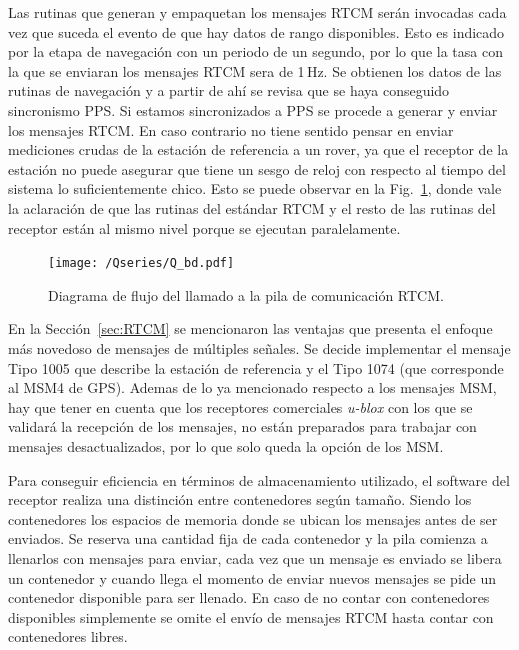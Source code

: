 \documentclass[a4paper,12pt,oneside,onecolumn,final,openright]{book}%
\begin{document}
	Las rutinas que generan y empaquetan los mensajes RTCM serán invocadas cada vez que suceda el evento de que hay datos de rango disponibles. Esto es indicado por la etapa de navegación con un periodo de un segundo, por lo que la tasa con la que se enviaran los mensajes RTCM sera de 1\,Hz. Se obtienen los datos de las rutinas de navegación y a partir de ahí se revisa que se haya conseguido sincronismo PPS. Si estamos sincronizados a PPS se procede a generar y enviar los mensajes RTCM. En caso contrario no tiene sentido pensar en enviar mediciones crudas de la estación de referencia a un rover, ya que el receptor de la estación no puede asegurar que tiene un sesgo de reloj con respecto al tiempo del sistema lo suficientemente chico. Esto se puede observar en la Fig.~\ref{fig:diagramaflujo_RTCM}, donde vale la aclaración de que las rutinas del estándar RTCM y el resto de las rutinas del receptor están al mismo nivel porque se ejecutan paralelamente.

\begin{figure}
    \centering
	\texttt{[image: /Qseries/Q\_bd.pdf]}
    \caption{Diagrama de flujo del llamado a la pila de comunicación RTCM.}
    \label{fig:diagramaflujo_RTCM}
\end{figure}

	En la Sección~\ref{sec:RTCM} se mencionaron las ventajas que presenta el enfoque más novedoso de mensajes de múltiples señales. Se decide implementar el mensaje Tipo 1005 que describe la estación de referencia y el Tipo 1074 (que corresponde al MSM4 de GPS). Ademas de lo ya mencionado respecto a los mensajes MSM, hay que tener en cuenta que los receptores comerciales \textit{u-blox} con los que se validará la recepción de los mensajes, no están preparados para trabajar con mensajes desactualizados, por lo que solo queda la opción de los MSM.
	
	Para conseguir eficiencia en términos de almacenamiento utilizado, el software del receptor realiza una distinción entre contenedores según tamaño. Siendo los contenedores los espacios de memoria donde se ubican los mensajes antes de ser enviados. Se reserva una cantidad fija de cada contenedor y la pila comienza a llenarlos con mensajes para enviar, cada vez que un mensaje es enviado se libera un contenedor y cuando llega el momento de enviar nuevos mensajes se pide un contenedor disponible para ser llenado. En caso de no contar con contenedores disponibles simplemente se omite el envío de mensajes RTCM hasta contar con contenedores libres.
	
\end{document}
